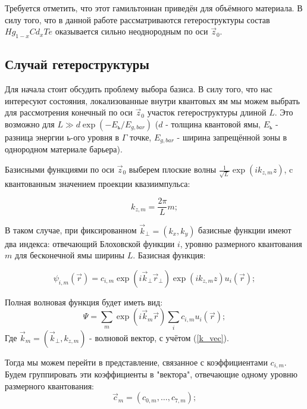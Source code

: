 \documentclass[../main.tex]{subfiles}
\begin{document}
    Требуется отметить, что этот гамильтониан приведён для объёмного материала.
    В силу того, что в данной работе рассматриваются гетероструктуры состав 
    $Hg_{1-x}Cd_{x}Te$ оказывается сильно неоднородным по оси $\vec{z}_0$.

    \subsection{Случай гетероструктуры}

    Для начала стоит обсудить проблему выбора базиса. В силу того, что нас 
    интересуют состояния, локализованные внутри квантовых ям мы можем выбрать
    для рассмотрения конечный по оси $\vec{z}_0$ участок гетероструктуры длиной
    $L$. Это возможно для $L \gg d \exp(- E_ь / E_{g, bar})$ ($d$ - толщина квантовой
    ямы, $E_ь$ - разница энергии $ь$-ого уровня в $\Gamma$ точке, $E_{g,bar}$ - 
    ширина запрещённой зоны в однородном материале барьера).

    Базисными функциями по оси $\vec{z}_0$ выберем плоские волны 
    $\frac{1}{\sqrt L} \exp(i k_{z,m} z)$, c квантованным значением проекции 
    квазиимпульса: 
    
    \begin{equation}
        \label{k_vec}
        k_{z,m} = \frac{2\pi}{L} m;
    \end{equation}

    В таком случае, при фиксированном $\vec{k}_\perp = (k_x,k_y)$ базисные 
    функции имеют два индекса: отвечающий Блоховской функции $i$, уровню размерного
    квантования $m$ для бесконечной ямы ширины $L$. Базисная функция:

    \begin{equation}
        \psi_{i,m}(\vec r) = c_{i, m} \exp(i \vec{k}_\perp \vec{r}_\perp) \exp(i k_{z,m} z) u_i(\vec r);
    \end{equation}

    Полная волновая функция будет иметь вид:
    \begin{equation}
        \Psi = \sum_m \exp(i \vec{k}_{m} \vec r) \sum_{i}  c_{i,m} u_i(\vec r);
    \end{equation}
    Где $\vec{k}_m = (\vec{k}_\perp,k_{z,m})$ - волновой вектор, с учётом (\ref{k_vec}). 

    Тогда мы можем перейти в представление, связанное с коэффициентами $c_{i,m}$. 
    Будем группировать эти коэффициенты в "вектора", отвечающие одному уровню 
    размерного квантования:
    \begin{equation*}
        \vec{c}_m = (c_{0, m},\hdots,c_{7, m});
    \end{equation*}
\end{document}
